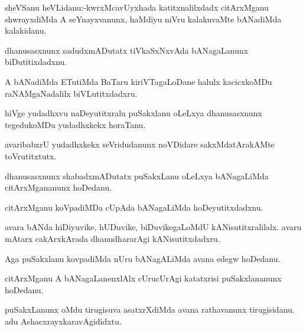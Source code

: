 \documentclass{article}
\begin{document}
\begin{mn}%
sheVSanu heVLidanu:-kwrxMcavUyxhada katitxnalilxdadx citArxMganu shwrayxdiMda A 
seYnayxvanunx, haMdiyu niVru kalakuvaMte bANadiMda kalakidanu.
\end{mn}

\begin{mn}%
dhanusasxnunx sadudxmADutatx tiVkaSxNxvAda bANagaLanunx biDutitixdadxnu.
\end{mn}

\begin{mn}%
A bANadiMda ETutiMda BaTaru kiriVTagaLoDane halulx kacicxkoMDu raNAMgaNadalilx 
biVLutitxdadxru.
\end{mn}

\begin{mn}%
hiVge yudadhxvu naDeyutitxralu puSakxlanu oLeLxya dhanusasxnunx tegedukoMDu yudadhxkekx 
horaTanu.
\end{mn}

\begin{mn}%
avaribabxrU yudadhxkekx seVridudanunx noVDidare sakxMdatArakAMte toVrutitxtutx.
\end{mn}

\begin{mn}%
dhanusasxnunx shabadxmADutatx  puSakxLanu oLeLxya bANagaLiMda citArxMgananunx hoDedanu.
\end{mn}

\begin{mn}%
citArxMganu koVpadiMDa cUpAda bANagaLiMda hoDeyutitxdadxnu.
\end{mn}

\begin{mn}%
avara bANda hiDiyuvike, hUDuvike, biDuvikegaLoMdU kANisutitxralilalx. avaru mAtarx 
cakArxkArada dhanudhararAgi kANisutitxdadxru.
\end{mn}

\begin{mn}%
Aga puSakxlanu kovpadiMda nUru bANagALiMda avana edegw hoDedanu.
\end{mn}

\begin{mn}%
citArxMganu A bANagaLanenxlAlx cUrucUrAgi katatxrisi puSakxlananunx hoDedanu.
\end{mn}

\begin{mn}%
puSakxLanunx oMdu tirugisuva asatxrXdiMda avana rathavanunx tirugisidanu. adu 
AshacxrayxkaravAgididxtu.
\end{mn}
\end{document}
